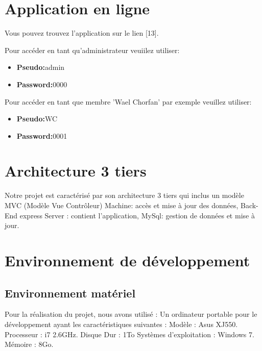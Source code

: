 \section{Application en ligne}
Vous pouvez trouvez l'application sur le lien [13].


  Pour acc\'{e}der en tant qu'administrateur veuiilez utiliser:

  \begin{itemize}
    \item {\textbf{ Pseudo:}admin}
    \item {\textbf{ Password:}0000}
  \end{itemize}


  Pour acc\'{e}der en tant que membre 'Wael Chorfan' par exemple veuillez utiliser:

  \begin{itemize}
    \item {\textbf{ Pseudo:}WC}
    \item {\textbf{ Password:}0001}
  \end{itemize}

 \newpage



 \section{ Architecture 3 tiers}

Notre projet est caract\'{e}ris\'{e} par son architecture 3 tiers qui inclus un mod\`{e}le MVC (Mod\`{e}le
Vue Contr\^{o}leur)
\textbullet{} Machine: acc\`{e}s et mise \`{a} jour des donn\'{e}es,
\textbullet{} Back-End express Server : contient l'application,
\textbullet{} MySql: gestion de donn\'{e}es et mise \`{a} jour.


\section{Environnement de d\'{e}veloppement}
  \subsection{Environnement mat\'{e}riel }
  Pour la r\'{e}alisation du projet, nous avons utilis\'{e} :
 Un ordinateur portable pour le d\'{e}veloppement ayant les caract\'{e}ristiques suivantes :
\textbullet{} Mod\`{e}le : Asus XJ550.
\textbullet{} Processeur : i7 2.6GHz.
\textbullet{} Disque Dur : 1To
\textbullet{} Syst\`{e}mes d'exploitation : Windows 7.
\textbullet{} M\'{e}moire : 8Go.


